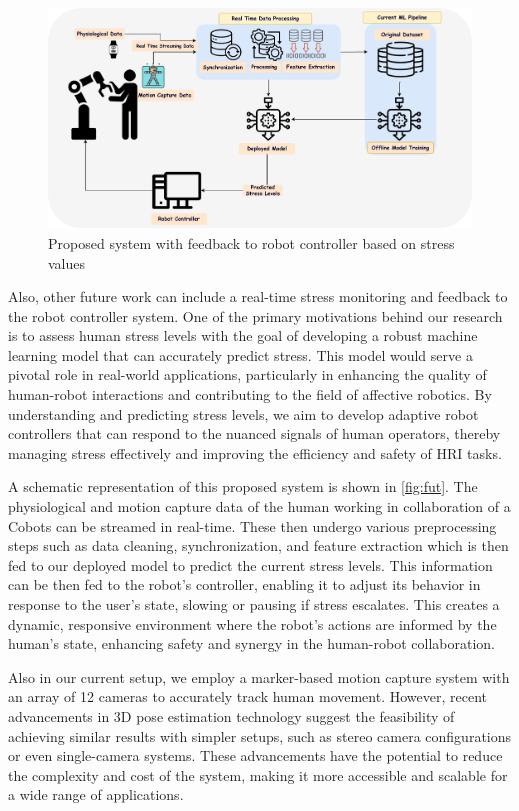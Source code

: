 \begin{figure}[!htbp]
	\centering
	\includegraphics[width=\columnwidth]{images/onlineschematic.drawio (1).pdf}
	\caption{Proposed system with feedback to robot controller based on stress values}
	\label{fig:fut}
\end{figure}


Also, other future work can include a real-time stress monitoring and feedback to the robot controller system.
One of the primary motivations behind our research is to assess human stress levels with the goal of developing a robust machine learning model that can accurately predict stress. This model would serve a pivotal role in real-world applications, particularly in enhancing the quality of human-robot interactions and contributing to the field of affective robotics. By understanding and predicting stress levels, we aim to develop adaptive robot controllers that can respond to the nuanced signals of human operators, thereby managing stress effectively and improving the efficiency and safety of HRI tasks.

A schematic representation of this proposed system is shown in \autoref{fig:fut}. The physiological and motion capture data of the human working in collaboration of a \gls{Cobots} can be streamed in real-time. 
These then undergo various preprocessing steps such as data cleaning, synchronization, and feature extraction which is then fed to our deployed model to predict the current stress levels.
This information can be then fed to the robot's controller, enabling it to adjust its behavior in response to the user's state, slowing or pausing if stress escalates.
This creates a dynamic, responsive environment where the robot's actions are informed by the human's state, enhancing safety and synergy in the human-robot collaboration.

Also in our current setup, we employ a marker-based motion capture system with an array of 12 cameras to accurately track human movement. However, recent advancements in 3D pose estimation technology suggest the feasibility of achieving similar results with simpler setups, such as stereo camera configurations or even single-camera systems\parencite{luvizon2023sceneaware}. These advancements have the potential to reduce the complexity and cost of the system, making it more accessible and scalable for a wide range of applications.


